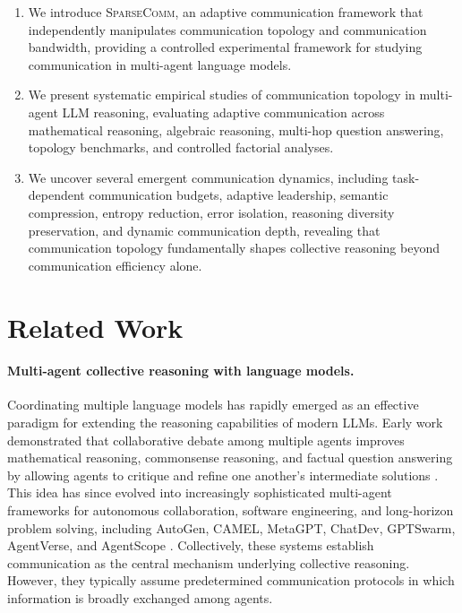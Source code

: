 \documentclass[11pt]{article}
\newcommand{\sys}{\textsc{SparseComm}\xspace}
\begin{document}
\begin{enumerate}[leftmargin=1.5em]

\item We introduce \sys, an adaptive communication framework that independently manipulates communication topology and communication bandwidth, providing a controlled experimental framework for studying communication in multi-agent language models.

\item We present systematic empirical studies of communication topology in multi-agent LLM reasoning, evaluating adaptive communication across mathematical reasoning, algebraic reasoning, multi-hop question answering, topology benchmarks, and controlled factorial analyses.

\item We uncover several emergent communication dynamics, including task-dependent communication budgets, adaptive leadership, semantic compression, entropy reduction, error isolation, reasoning diversity preservation, and dynamic communication depth, revealing that communication topology fundamentally shapes collective reasoning beyond communication efficiency alone.

\end{enumerate}

\section{Related Work}
\label{sec:related}

\paragraph{Multi-agent collective reasoning with language models.}

Coordinating multiple language models has rapidly emerged as an effective paradigm for extending the reasoning capabilities of modern LLMs. Early work demonstrated that collaborative debate among multiple agents improves mathematical reasoning, commonsense reasoning, and factual question answering by allowing agents to critique and refine one another's intermediate solutions \citep{du2024improving,liang-etal-2024-encouraging,chan2023chatevalbetterllmbasedevaluators}. This idea has since evolved into increasingly sophisticated multi-agent frameworks for autonomous collaboration, software engineering, and long-horizon problem solving, including AutoGen, CAMEL, MetaGPT, ChatDev, GPTSwarm, AgentVerse, and AgentScope \citep{wu2024autogen,li2023camel,hong2024metagpt,qian-etal-2024-chatdev,zhuge2024gptswarm,chen2023agentverse,gao2024agentscopeflexiblerobustmultiagent}. Collectively, these systems establish communication as the central mechanism underlying collective reasoning. However, they typically assume predetermined communication protocols in which information is broadly exchanged among agents.
\end{document}
